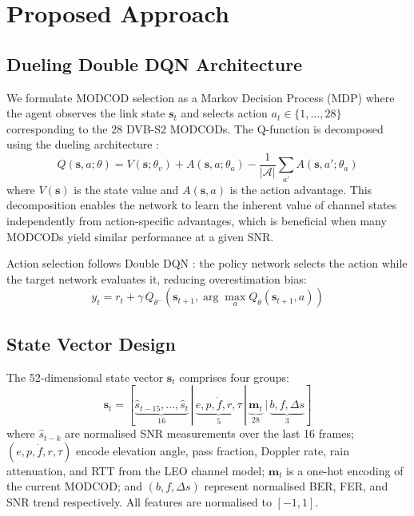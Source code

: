 \documentclass[conference]{IEEEtran}
\begin{document}
\section{Proposed Approach}

\subsection{Dueling Double DQN Architecture}

We formulate MODCOD selection as a Markov Decision Process (MDP) where the agent observes the link state $\mathbf{s}_t$ and selects action $a_t \in \{1, \ldots, 28\}$ corresponding to the 28 DVB-S2 MODCODs. The Q-function is decomposed using the dueling architecture \cite{wang2016dueling}:
\begin{equation}
Q(\mathbf{s}, a; \theta) = V(\mathbf{s}; \theta_v) + A(\mathbf{s}, a; \theta_a) - \frac{1}{|\mathcal{A}|}\sum_{a'} A(\mathbf{s}, a'; \theta_a)
\label{eq:dueling}
\end{equation}
where $V(\mathbf{s})$ is the state value and $A(\mathbf{s}, a)$ is the action advantage. This decomposition enables the network to learn the inherent value of channel states independently from action-specific advantages, which is beneficial when many MODCODs yield similar performance at a given SNR.

Action selection follows Double DQN \cite{vanhasselt2016}: the policy network selects the action while the target network evaluates it, reducing overestimation bias:
\begin{equation}
y_t = r_t + \gamma \, Q_{\theta^-}\!\left(\mathbf{s}_{t+1}, \arg\max_a Q_\theta(\mathbf{s}_{t+1}, a)\right)
\end{equation}

\subsection{State Vector Design}

The 52-dimensional state vector $\mathbf{s}_t$ comprises four groups:
\begin{equation}
\mathbf{s}_t = [\underbrace{\hat{s}_{t-15}, \ldots, \hat{s}_t}_{16} \,|\, \underbrace{e, p, \dot{f}, r, \tau}_{5} \,|\, \underbrace{\mathbf{m}_t}_{28} \,|\, \underbrace{b, f, \Delta s}_{3}]
\label{eq:state}
\end{equation}
where $\hat{s}_{t-k}$ are normalised SNR measurements over the last 16 frames; $(e, p, \dot{f}, r, \tau)$ encode elevation angle, pass fraction, Doppler rate, rain attenuation, and RTT from the LEO channel model; $\mathbf{m}_t$ is a one-hot encoding of the current MODCOD; and $(b, f, \Delta s)$ represent normalised BER, FER, and SNR trend respectively. All features are normalised to $[-1, 1]$.
\end{document}
